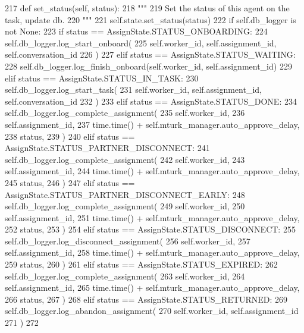 \begin{DoxyCode}
217     \textcolor{keyword}{def }set\_status(self, status):
218         \textcolor{stringliteral}{"""}
219 \textcolor{stringliteral}{        Set the status of this agent on the task, update db.}
220 \textcolor{stringliteral}{        """}
221         self.state.set\_status(status)
222         \textcolor{keywordflow}{if} self.db\_logger \textcolor{keywordflow}{is} \textcolor{keywordflow}{not} \textcolor{keywordtype}{None}:
223             \textcolor{keywordflow}{if} status == AssignState.STATUS\_ONBOARDING:
224                 self.db\_logger.log\_start\_onboard(
225                     self.worker\_id, self.assignment\_id, self.conversation\_id
226                 )
227             \textcolor{keywordflow}{elif} status == AssignState.STATUS\_WAITING:
228                 self.db\_logger.log\_finish\_onboard(self.worker\_id, self.assignment\_id)
229             \textcolor{keywordflow}{elif} status == AssignState.STATUS\_IN\_TASK:
230                 self.db\_logger.log\_start\_task(
231                     self.worker\_id, self.assignment\_id, self.conversation\_id
232                 )
233             \textcolor{keywordflow}{elif} status == AssignState.STATUS\_DONE:
234                 self.db\_logger.log\_complete\_assignment(
235                     self.worker\_id,
236                     self.assignment\_id,
237                     time.time() + self.mturk\_manager.auto\_approve\_delay,
238                     status,
239                 )
240             \textcolor{keywordflow}{elif} status == AssignState.STATUS\_PARTNER\_DISCONNECT:
241                 self.db\_logger.log\_complete\_assignment(
242                     self.worker\_id,
243                     self.assignment\_id,
244                     time.time() + self.mturk\_manager.auto\_approve\_delay,
245                     status,
246                 )
247             \textcolor{keywordflow}{elif} status == AssignState.STATUS\_PARTNER\_DISCONNECT\_EARLY:
248                 self.db\_logger.log\_complete\_assignment(
249                     self.worker\_id,
250                     self.assignment\_id,
251                     time.time() + self.mturk\_manager.auto\_approve\_delay,
252                     status,
253                 )
254             \textcolor{keywordflow}{elif} status == AssignState.STATUS\_DISCONNECT:
255                 self.db\_logger.log\_disconnect\_assignment(
256                     self.worker\_id,
257                     self.assignment\_id,
258                     time.time() + self.mturk\_manager.auto\_approve\_delay,
259                     status,
260                 )
261             \textcolor{keywordflow}{elif} status == AssignState.STATUS\_EXPIRED:
262                 self.db\_logger.log\_complete\_assignment(
263                     self.worker\_id,
264                     self.assignment\_id,
265                     time.time() + self.mturk\_manager.auto\_approve\_delay,
266                     status,
267                 )
268             \textcolor{keywordflow}{elif} status == AssignState.STATUS\_RETURNED:
269                 self.db\_logger.log\_abandon\_assignment(
270                     self.worker\_id, self.assignment\_id
271                 )
272 
\end{DoxyCode}
